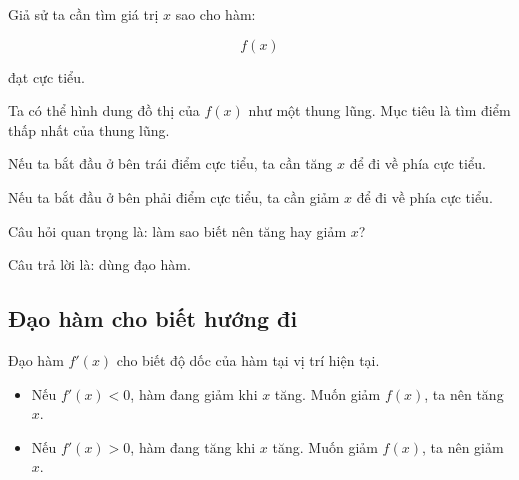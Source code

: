 Giả sử ta cần tìm giá trị $x$ sao cho hàm:

\[
    f(x)
\]

đạt cực tiểu.

Ta có thể hình dung đồ thị của $f(x)$ như một thung lũng. Mục tiêu là tìm điểm thấp nhất của thung lũng.

\begin{center}
\end{center}

Nếu ta bắt đầu ở bên trái điểm cực tiểu, ta cần tăng $x$ để đi về phía cực tiểu.

Nếu ta bắt đầu ở bên phải điểm cực tiểu, ta cần giảm $x$ để đi về phía cực tiểu.

Câu hỏi quan trọng là: làm sao biết nên tăng hay giảm $x$?

Câu trả lời là: dùng đạo hàm.

\subsection{Đạo hàm cho biết hướng đi}

Đạo hàm $f'(x)$ cho biết độ dốc của hàm tại vị trí hiện tại.

\begin{itemize}
    \item Nếu $f'(x) < 0$, hàm đang giảm khi $x$ tăng. Muốn giảm $f(x)$, ta nên tăng $x$.
    \item Nếu $f'(x) > 0$, hàm đang tăng khi $x$ tăng. Muốn giảm $f(x)$, ta nên giảm $x$.
\end{itemize}

